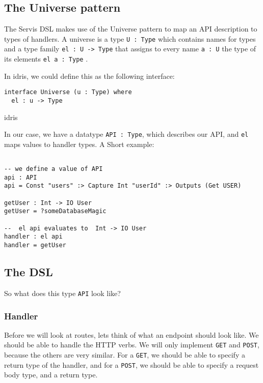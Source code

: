 \documentclass[12pt,a4paper]{article}
\begin{document}
\subsection{The Universe pattern}
The Servis DSL makes use of the Universe pattern to map an API description to types of handlers.
 A universe is a type \texttt{U : Type} which contains names for types and a type family \texttt{el : U -> Type} that assigns to every name \texttt{a : U} the type of its elements \texttt{el a : Type} \cite{generic}\@.

 In idris, we could define this as the following interface:
 \begin{listing}
 \begin{verbatim}
interface Universe (u : Type) where
  el : u -> Type
 \end{verbatim}{idris}
   \caption{Universe interface in Idris}
 \end{listing}

 In our case, we have a datatype \texttt{API : Type}, which describes our API, and \texttt{el} maps values to handler types. A Short example:
 \begin{verbatim}

-- we define a value of API
api : API
api = Const "users" :> Capture Int "userId" :> Outputs (Get USER)

getUser : Int -> IO User
getUser = ?someDatabaseMagic

--  el api evaluates to  Int -> IO User
handler : el api
handler = getUser
 \end{verbatim}
\subsection{The DSL}
So what does this type \texttt{API} look like?
\subsubsection{Handler}
Before we will look at routes, lets think of what an endpoint should look like.
We should be able to handle the HTTP verbs. We will only implement \texttt{GET} and \texttt{POST}, because the others are very similar.
For a \texttt{GET}, we should be able to specify a return type of the handler,  and for a \texttt{POST}, we should be able to
specify a request body type, and a return type.
\end{document}
